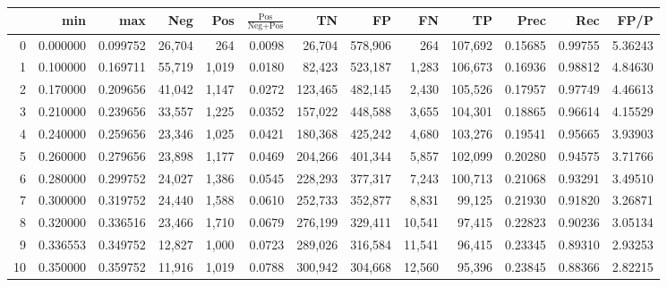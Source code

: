 \begin{tabular}{rrrrrrrrrrrrr}
\toprule
{} &       min &       max &     Neg &    Pos & $\frac{\text{Pos}}{\text{Neg}+\text{Pos}}$ &       TN &       FP &       FN &       TP &     Prec &      Rec &     FP/P \\
\midrule
0  &  0.000000 &  0.099752 &  26,704 &    264 &                                     0.0098 &   26,704 &  578,906 &      264 &  107,692 &  0.15685 &  0.99755 &  5.36243 \\
1  &  0.100000 &  0.169711 &  55,719 &  1,019 &                                     0.0180 &   82,423 &  523,187 &    1,283 &  106,673 &  0.16936 &  0.98812 &  4.84630 \\
2  &  0.170000 &  0.209656 &  41,042 &  1,147 &                                     0.0272 &  123,465 &  482,145 &    2,430 &  105,526 &  0.17957 &  0.97749 &  4.46613 \\
3  &  0.210000 &  0.239656 &  33,557 &  1,225 &                                     0.0352 &  157,022 &  448,588 &    3,655 &  104,301 &  0.18865 &  0.96614 &  4.15529 \\
4  &  0.240000 &  0.259656 &  23,346 &  1,025 &                                     0.0421 &  180,368 &  425,242 &    4,680 &  103,276 &  0.19541 &  0.95665 &  3.93903 \\
5  &  0.260000 &  0.279656 &  23,898 &  1,177 &                                     0.0469 &  204,266 &  401,344 &    5,857 &  102,099 &  0.20280 &  0.94575 &  3.71766 \\
6  &  0.280000 &  0.299752 &  24,027 &  1,386 &                                     0.0545 &  228,293 &  377,317 &    7,243 &  100,713 &  0.21068 &  0.93291 &  3.49510 \\
7  &  0.300000 &  0.319752 &  24,440 &  1,588 &                                     0.0610 &  252,733 &  352,877 &    8,831 &   99,125 &  0.21930 &  0.91820 &  3.26871 \\
8  &  0.320000 &  0.336516 &  23,466 &  1,710 &                                     0.0679 &  276,199 &  329,411 &   10,541 &   97,415 &  0.22823 &  0.90236 &  3.05134 \\
9  &  0.336553 &  0.349752 &  12,827 &  1,000 &                                     0.0723 &  289,026 &  316,584 &   11,541 &   96,415 &  0.23345 &  0.89310 &  2.93253 \\
10 &  0.350000 &  0.359752 &  11,916 &  1,019 &                                     0.0788 &  300,942 &  304,668 &   12,560 &   95,396 &  0.23845 &  0.88366 &  2.82215 \\

\end{tabular}
